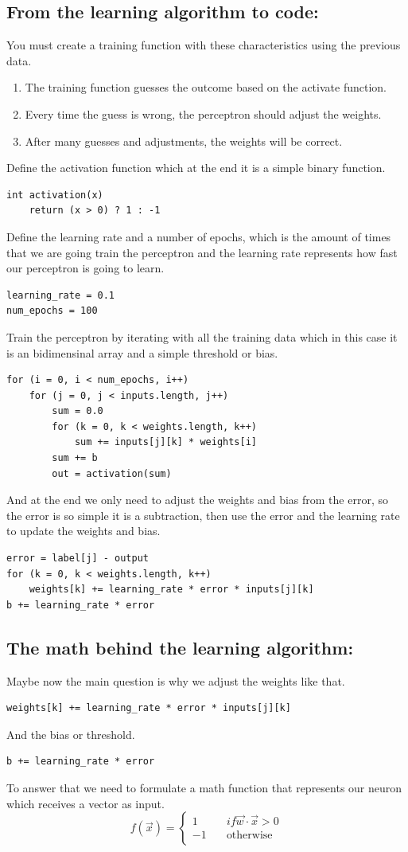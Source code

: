 \documentclass[12pt]{article}
\begin{document}
\subsection{From the learning algorithm to code:}
You must create a training function with these characteristics using the previous data.
\begin{enumerate}
\item The training function guesses the outcome based on the activate function.
\item Every time the guess is wrong, the perceptron should adjust the weights.
\item After many guesses and adjustments, the weights will be correct.
\end{enumerate}
Define the activation function which at the end it is a simple binary function.
\begin{verbatim}
int activation(x)
    return (x > 0) ? 1 : -1
\end{verbatim}
Define the learning rate and a number of epochs, which is the amount of times that we are going
train the perceptron and the learning rate represents how fast our perceptron is going to learn.
\begin{verbatim}
learning_rate = 0.1
num_epochs = 100
\end{verbatim}
Train the perceptron by iterating with all the training data which in this case it is an bidimensinal
array and a simple threshold or bias.
\begin{verbatim}
for (i = 0, i < num_epochs, i++)
    for (j = 0, j < inputs.length, j++)
        sum = 0.0
        for (k = 0, k < weights.length, k++)
            sum += inputs[j][k] * weights[i]
        sum += b
        out = activation(sum)
\end{verbatim}
And at the end we only need to adjust the weights and bias from the error, so the error is so simple
it is  a subtraction, then use the error and the learning rate to update the weights and bias.
\begin{verbatim}
error = label[j] - output
for (k = 0, k < weights.length, k++)
    weights[k] += learning_rate * error * inputs[j][k]
b += learning_rate * error
\end{verbatim}
\subsection{The math behind the learning algorithm:}
Maybe now the main question is why we adjust the weights like that.
\begin{verbatim}
weights[k] += learning_rate * error * inputs[j][k]
\end{verbatim}
And the bias or threshold.
\begin{verbatim}
b += learning_rate * error
\end{verbatim}
To answer that we need to formulate a math function that represents our neuron which receives a vector
as input.
\[
  f(\vec{x}) = 
  \begin{cases}
    1 &\quad if \vec{w} \cdot \vec{x} > 0  \\
    -1 &\quad \text{otherwise} \\
  \end{cases}
\]
\end{document}
